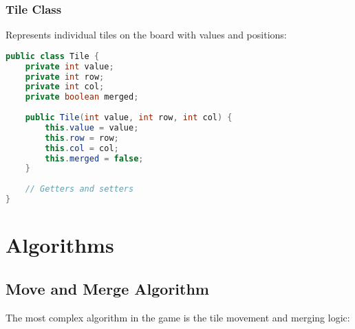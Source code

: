 \documentclass[12pt, a4paper]{article}
\begin{document}
\subsubsection{Tile Class}
Represents individual tiles on the board with values and positions:

\begin{lstlisting}[language=Java, caption=Tile Class Implementation]
public class Tile {
    private int value;
    private int row;
    private int col;
    private boolean merged;
    
    public Tile(int value, int row, int col) {
        this.value = value;
        this.row = row;
        this.col = col;
        this.merged = false;
    }
    
    // Getters and setters
}
\end{lstlisting}

\section{Algorithms}

\subsection{Move and Merge Algorithm}
The most complex algorithm in the game is the tile movement and merging logic:
\end{document}
